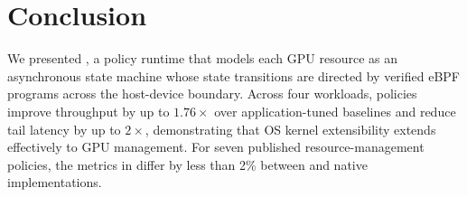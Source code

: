 \section{Conclusion}
\label{sec:conclusion}
We presented \sys, a policy runtime that models each GPU resource as an asynchronous state machine whose state transitions are directed by verified eBPF programs across the host-device boundary.
Across four workloads, \sys{} policies improve throughput by up to $1.76\times$ over application-tuned baselines and reduce tail latency by up to $2\times$, demonstrating that OS kernel extensibility extends effectively to GPU management.
For seven published resource-management policies, the metrics in  differ by less than 2\% between \sys{} and native implementations.
